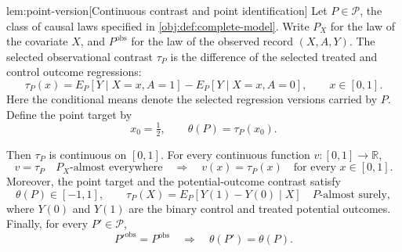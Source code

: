 \documentclass[11pt]{article}
\begin{document}
\begin{lemmav}{lem:point-version}[Continuous contrast and point identification]
Let \(P\in\mathcal P\), the class of causal laws specified in \cref{obj:def:complete-model}. Write \(P_X\) for the law of the covariate \(X\), and \(P^{\mathrm{obs}}\) for the law of the observed record \((X,A,Y)\). The selected observational contrast \(\tau_P\) is the difference of the selected treated and control outcome regressions:
\[
\tau_P(x)
=
E_P[Y\mid X=x,A=1]
-
E_P[Y\mid X=x,A=0],
\qquad x\in[0,1].
\]
Here the conditional means denote the selected regression versions carried by \(P\). Define the point target by
\[
x_0=\tfrac12,
\qquad
\theta(P)=\tau_P(x_0).
\]

Then \(\tau_P\) is continuous on \([0,1]\). For every continuous function \(v:[0,1]\to\mathbb R\),
\[
v=\tau_P\quad P_X\text{-almost everywhere}
\quad\Longrightarrow\quad
v(x)=\tau_P(x)\quad\text{for every }x\in[0,1].
\]
Moreover, the point target and the potential-outcome contrast satisfy
\[
\theta(P)\in[-1,1],
\qquad
\tau_P(X)=E_P[Y(1)-Y(0)\mid X]
\quad P\text{-almost surely},
\]
where \(Y(0)\) and \(Y(1)\) are the binary control and treated potential outcomes. Finally, for every \(P'\in\mathcal P\),
\[
P'^{\mathrm{obs}}=P^{\mathrm{obs}}
\quad\Longrightarrow\quad
\theta(P')=\theta(P).
\]
\end{lemmav}
\end{document}
